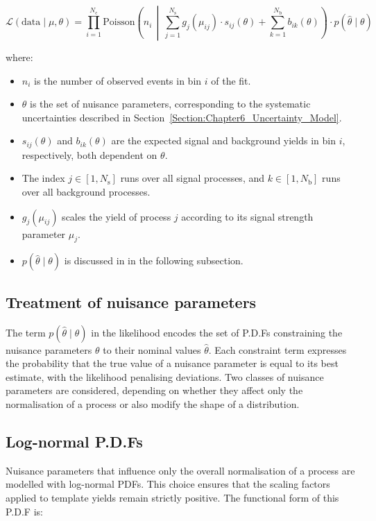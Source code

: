 \begin{equation}
\mathscr{L}(\text{data} \mid \mu, \theta) = \prod_{i=1}^{N_{\mathrm{c}}}
\mathrm{Poisson} 
\left(
n_i \,\middle|\,
\sum_{j=1}^{N_{\mathrm{s}}} g_j(\mu_{ij}) \cdot s_{ij}(\theta)
+ \sum_{k=1}^{N_{\mathrm{b}}} b_{ik}(\theta)
\right)
\cdot
p(\hat{\theta} \mid \theta)
\end{equation}

where:
\begin{itemize}
    \item $n_i$ is the number of observed events in bin $i$ of the fit.
    \item $\theta$ is the set of nuisance parameters, corresponding to the systematic uncertainties described in Section~\ref{Section:Chapter6_Uncertainty_Model}.
    \item $s_{ij}(\theta)$ and $b_{ik}(\theta)$ are the expected signal and background yields in bin $i$, respectively, both dependent on $\theta$.
    \item The index $j \in [1, N_{\mathrm{s}}]$ runs over all signal processes, and $k \in [1, N_{\mathrm{b}}]$ runs over all background processes.
    \item $g_j(\mu_{ij})$ scales the yield of process $j$ according to its signal strength parameter $\mu_j$.
    \item $p(\hat{\theta} \mid \theta)$ is discussed in in the following subsection.

\end{itemize}

\subsection{Treatment of nuisance parameters}

The term $p(\hat{\theta} \mid \theta)$ in the likelihood encodes the set of \acp{P.D.F} constraining the nuisance parameters $\theta$ to their nominal values $\hat{\theta}$. Each constraint term expresses the probability that the true value of a nuisance parameter is equal to its best estimate, with the likelihood penalising deviations. Two classes of nuisance parameters are considered, depending on whether they affect only the normalisation of a process or also modify the shape of a distribution.

\subsection{Log-normal P.D.Fs}  
Nuisance parameters that influence only the overall normalisation of a process are modelled with log-normal PDFs. This choice ensures that the scaling factors applied to template yields remain strictly positive. The functional form of this \ac{P.D.F} is:

